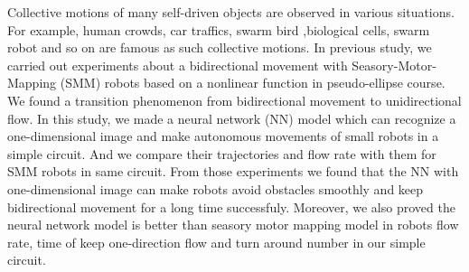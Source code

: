 
Collective motions of many self-driven objects are observed in various situations.
For example, human crowds, car traffics, swarm bird ,biological cells, swarm robot and so on 
are famous as such collective motions.
In previous study, we carried out experiments about
a bidirectional movement with Seasory-Motor-Mapping (SMM) robots based on a nonlinear function 
in pseudo-ellipse course.
We found a transition phenomenon from bidirectional movement to unidirectional flow.
In this study, we made a neural network (NN) model which can recognize a one-dimensional image and
make autonomous movements of small robots in a simple circuit.
And we compare their trajectories and flow rate with them for SMM robots in same circuit. 
From those experiments we found that the NN with one-dimensional image 
can make robots avoid obstacles smoothly and keep bidirectional movement for a long time successfuly.
Moreover, we also proved the neural network model is better than seasory motor mapping model 
in robots flow rate, time of keep one-direction flow and turn around number in our simple circuit.

 

